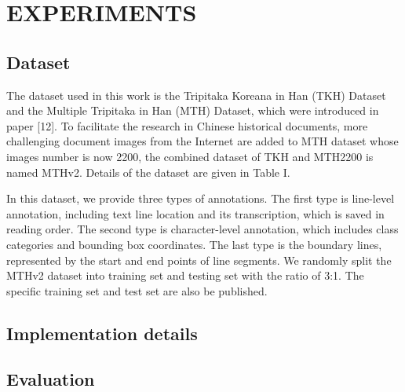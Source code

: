\section{EXPERIMENTS}


\subsection{Dataset}
The dataset\cite{Alpher03} used in this work is the Tripitaka Koreana in Han (TKH) Dataset and the Multiple Tripitaka in Han (MTH) Dataset, which were introduced in paper [12]. To facilitate the research in Chinese historical documents, more challenging document images from the Internet are added to MTH dataset whose images number is now 2200, the combined dataset of TKH and MTH2200 is named MTHv2. Details of the dataset are given in Table I. 

In this dataset, we provide three types of annotations. The first type is line-level annotation, including text line location and its transcription, which is saved in reading order. The second type is character-level annotation, which includes class categories and bounding box coordinates. The last type is the boundary lines, represented by the start and end points of line segments. We randomly split the MTHv2 dataset into training set and testing set with the ratio of 3:1. The specific training set and test set are also be published.

\subsection{Implementation details}


\subsection{Evaluation}

